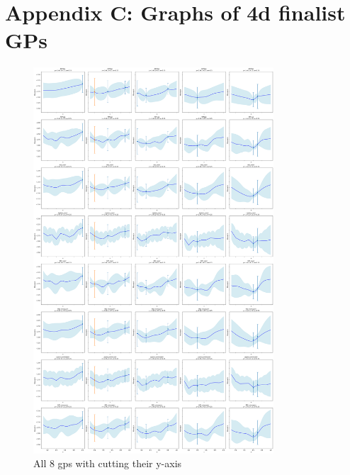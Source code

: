 \documentclass{article}
\begin{document}
\section{Appendix C: Graphs of 4d finalist GPs}
\label{appendix:C}


\begin{figure}[H]
    \centering
    \includegraphics[width=0.8\textwidth]{LatexPlots/final_gps_plots/final_gps_ycuts.png}
    \caption{All 8 gps with cutting their y-axis}
    \label{fig:best8_ycuts}
\end{figure}
\end{document}
